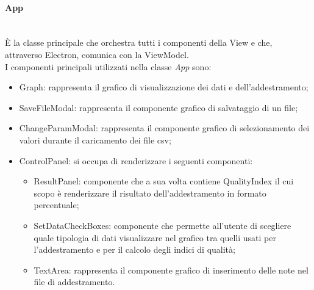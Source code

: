 		\paragraph*{App} \mbox{} \\[1mm]
		È la classe principale che orchestra tutti i componenti della View e che, attraverso Electron, comunica con la ViewModel. \\
		I componenti principali utilizzati nella classe \textit{App} sono:
		\begin{itemize}
			\item Graph: rappresenta il grafico di visualizzazione dei dati e dell'addestramento;
			\item SaveFileModal: rappresenta il componente grafico di salvataggio di un file;
			\item ChangeParamModal: rappresenta il componente grafico di selezionamento dei valori durante il caricamento dei file csv;
			\item ControlPanel: si occupa di renderizzare i seguenti componenti: \begin{itemize}
				\item ResultPanel: componente che a sua volta contiene QualityIndex il cui scopo è renderizzare il risultato dell'addestramento in formato percentuale;
				\item SetDataCheckBoxes: componente che permette all'utente di scegliere quale tipologia di dati visualizzare nel grafico tra quelli usati per l'addestramento e per il calcolo degli indici di qualità;
				\item TextArea: rappresenta il componente grafico di inserimento delle note nel file di addestramento.
			\end{itemize}
		\end{itemize}
